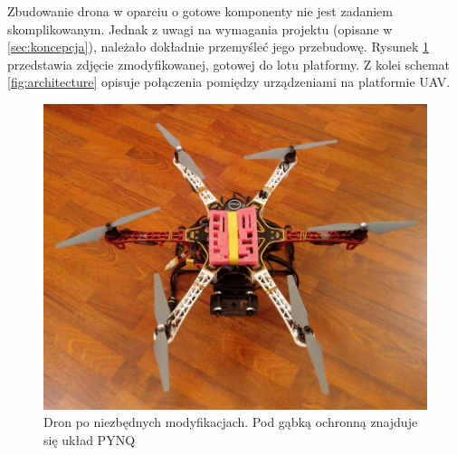 Zbudowanie drona w oparciu o gotowe komponenty nie jest zadaniem skomplikowanym. 
Jednak z uwagi na wymagania projektu (opisane w \ref{sec:koncepcja}), należało dokładnie przemyśleć jego przebudowę. Rysunek \ref{fig:drone_photo} przedstawia zdjęcie zmodyfikowanej, gotowej do lotu platformy. %
Z kolei schemat \ref{fig:architecture} opisuje połączenia pomiędzy urządzeniami na platformie UAV.  %
\begin{figure}[h]
	\centering
	\captionsetup{justification=centering,margin=1cm}
	\hspace*{0cm}
	\includegraphics[width=14cm]{5_drone_photo.jpg}
	\caption{Dron po niezbędnych modyfikacjach. Pod gąbką ochronną znajduje się układ PYNQ}
	\label{fig:drone_photo}
\end{figure}
